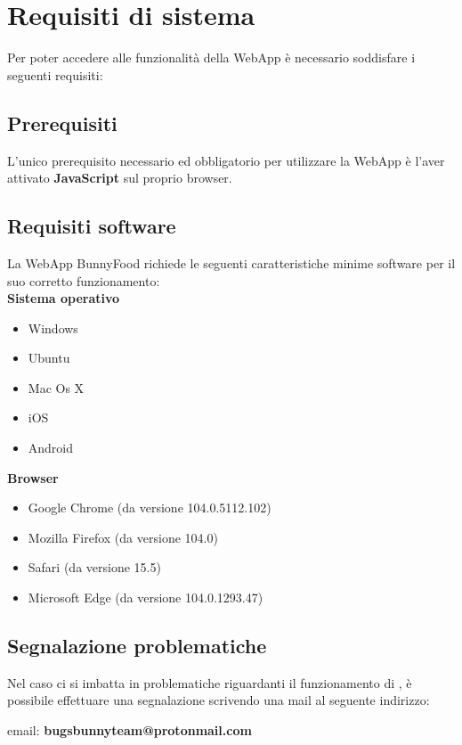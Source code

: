 \section{Requisiti di sistema}
Per poter accedere alle funzionalità della WebApp è necessario soddisfare i seguenti requisiti:

\subsection{Prerequisiti}
L'unico prerequisito necessario ed obbligatorio per utilizzare la WebApp \platform{} è l'aver attivato \textbf{JavaScript} sul proprio browser.

\subsection{Requisiti software}
La WebApp BunnyFood richiede le seguenti caratteristiche minime software per il suo corretto funzionamento:\\

\textbf{Sistema operativo}
\begin{itemize}
    \item Windows
    \item Ubuntu 
    \item Mac Os X
    \item iOS
    \item Android
\end{itemize}

\textbf{Browser}
\begin{itemize}
    \item Google Chrome (da versione 104.0.5112.102)
    \item Mozilla Firefox (da versione 104.0)
    \item Safari (da versione 15.5)
    \item Microsoft Edge (da versione 104.0.1293.47)
\end{itemize}

\subsection{Segnalazione problematiche}
Nel caso ci si imbatta in problematiche riguardanti il funzionamento di \platform, è possibile
effettuare una segnalazione scrivendo una mail al seguente indirizzo:\\


\begin{center}
email:    \textbf{bugsbunnyteam@protonmail.com}
\end{center}
